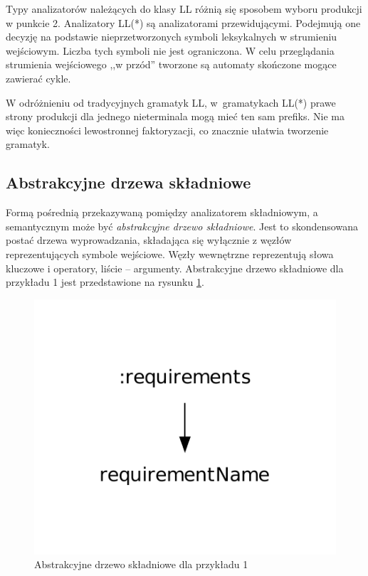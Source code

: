 Typy analizatorów należących do klasy LL różnią się sposobem wyboru produkcji w punkcie 2. 
Analizatory LL(*) są analizatorami przewidującymi. Podejmują one decyzję na
podstawie nieprzetworzonych symboli leksykalnych w strumieniu wejściowym. Liczba
tych symboli nie jest ograniczona. W celu przeglądania strumienia wejściowego 
,,w przód'' tworzone są automaty skończone mogące zawierać cykle.

W odróżnieniu od tradycyjnych gramatyk LL, w~gramatykach LL(*) prawe strony
produkcji dla jednego nieterminala mogą mieć ten sam prefiks. Nie ma więc 
konieczności lewostronnej faktoryzacji, co znacznie ułatwia tworzenie
gramatyk.

\subsection{Abstrakcyjne drzewa składniowe}

Formą pośrednią przekazywaną pomiędzy analizatorem składniowym, a semantycznym
może być \emph{abstrakcyjne drzewo składniowe}. Jest to skondensowana postać drzewa
wyprowadzania, składająca się
wyłącznie z węzłów reprezentujących symbole wejściowe. Węzły
wewnętrzne reprezentują słowa kluczowe i operatory, liście -- argumenty.
Abstrakcyjne drzewo składniowe dla przykładu 1 jest przedstawione na rysunku 
\ref{antlr_ast}.

\begin{figure}[h!]
  \centering
    \includegraphics[scale=0.8]{img/antlr_ast.pdf}
    \caption{Abstrakcyjne drzewo składniowe dla przykładu 1}
    \label{antlr_ast}
\end{figure}


